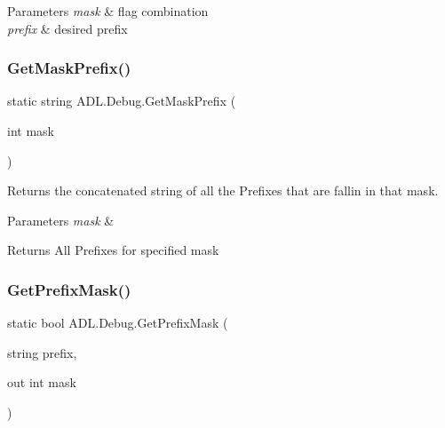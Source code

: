 \begin{DoxyParams}{Parameters}
{\em mask} & flag combination\\
\hline
{\em prefix} & desired prefix\\
\hline
\end{DoxyParams}
\mbox{\label{class_a_d_l_1_1_debug_ab0b0f7207f13fd82d9c37a3b6a564e1c}} 
\subsubsection{\texorpdfstring{Get\+Mask\+Prefix()}{GetMaskPrefix()}}
{\footnotesize\ttfamily static string A\+D\+L.\+Debug.\+Get\+Mask\+Prefix (\begin{DoxyParamCaption}\item[{int}]{mask }\end{DoxyParamCaption})\hspace{0.3cm}{\ttfamily [static]}}



Returns the concatenated string of all the Prefixes that are fallin in that mask. 


\begin{DoxyParams}{Parameters}
{\em mask} & \\
\hline
\end{DoxyParams}
\begin{DoxyReturn}{Returns}
All Prefixes for specified mask
\end{DoxyReturn}
\mbox{\label{class_a_d_l_1_1_debug_a2fe51aa97328f57e590d03a93d774b80}} 
\subsubsection{\texorpdfstring{Get\+Prefix\+Mask()}{GetPrefixMask()}}
{\footnotesize\ttfamily static bool A\+D\+L.\+Debug.\+Get\+Prefix\+Mask (\begin{DoxyParamCaption}\item[{string}]{prefix,  }\item[{out int}]{mask }\end{DoxyParamCaption})\hspace{0.3cm}{\ttfamily [static]}}



